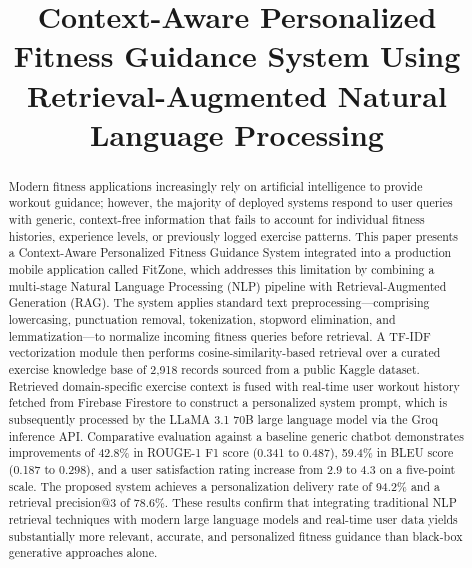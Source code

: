\documentclass[conference]{IEEEtran}
\begin{document}
\title{Context-Aware Personalized Fitness Guidance System Using\\
Retrieval-Augmented Natural Language Processing}

\author{
\and
{}
}

\maketitle

\begin{abstract}
Modern fitness applications increasingly rely on artificial intelligence to provide workout guidance; however, the majority of deployed systems respond to user queries with generic, context-free information that fails to account for individual fitness histories, experience levels, or previously logged exercise patterns. This paper presents a Context-Aware Personalized Fitness Guidance System integrated into a production mobile application called FitZone, which addresses this limitation by combining a multi-stage Natural Language Processing (NLP) pipeline with Retrieval-Augmented Generation (RAG). The system applies standard text preprocessing—comprising lowercasing, punctuation removal, tokenization, stopword elimination, and lemmatization—to normalize incoming fitness queries before retrieval. A TF-IDF vectorization module then performs cosine-similarity-based retrieval over a curated exercise knowledge base of 2,918 records sourced from a public Kaggle dataset. Retrieved domain-specific exercise context is fused with real-time user workout history fetched from Firebase Firestore to construct a personalized system prompt, which is subsequently processed by the LLaMA 3.1 70B large language model via the Groq inference API. Comparative evaluation against a baseline generic chatbot demonstrates improvements of 42.8\% in ROUGE-1 F1 score (0.341 to 0.487), 59.4\% in BLEU score (0.187 to 0.298), and a user satisfaction rating increase from 2.9 to 4.3 on a five-point scale. The proposed system achieves a personalization delivery rate of 94.2\% and a retrieval precision@3 of 78.6\%. These results confirm that integrating traditional NLP retrieval techniques with modern large language models and real-time user data yields substantially more relevant, accurate, and personalized fitness guidance than black-box generative approaches alone.
\end{abstract}
\end{document}
